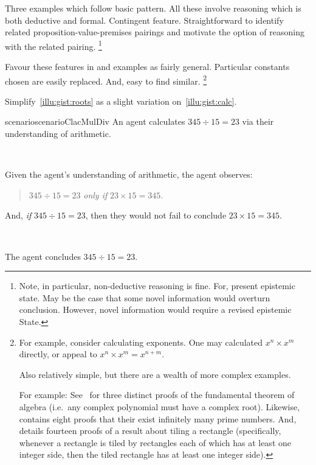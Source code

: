 \begin{note}
  Three examples which follow basic pattern.
  All these involve reasoning which is both deductive and formal.
  Contingent feature.
  Straightforward to identify related proposition-value-premises pairings and motivate the option of reasoning with the related pairing.%
  \footnote{
    Note, in particular, non-deductive reasoning is fine.
    For, present epistemic state.
    May be the case that some novel information would overturn conclusion.
    However, novel information would require a revised epistemic State.
  }

  Favour these features in  and examples as fairly general.
  Particular constants chosen are easily replaced.
  And, easy to find similar.%
  \footnote{
    For example, consider calculating exponents.
    One may calculated \(x^{n} \times x^{m}\) directly, or appeal to \(x^{n} \times x^{m} = x^{n + m}\).
 
    Also relatively simple, but there are a wealth of more complex examples.

    For example:
    See~\textcite{Fine:1997vc} for three distinct proofs of the fundamental theorem of algebra (i.e.\ any complex polynomial must have a complex root).
    Likewise, \textcite{Ribenboim:2012ts} contains eight proofs that their exist infinitely many prime numbers.
    And, \textcite{Wagon:1987vm} details fourteen proofs of a result about tiling a rectangle (specifically, whenever a rectangle is tiled by rectangles each of which has at least one integer side, then the tiled rectangle has at least one integer side).
  }
\end{note}

\begin{note}
  Simplify~\ref{illu:gist:roots} as a slight variation on~\ref{illu:gist:calc}.

  \begin{restatable}{scenario}{scenarioClacMulDiv}
    \label{illu:sketch:math}
    An agent calculates \(345 \div 15 = 23\) via their understanding of arithmetic.

    \mbox{ }

    Given the agent's understanding of arithmetic, the agent observes:
    \begin{quote}
      \(345 \div 15 = 23\) \emph{only if} \(23 \times 15 = 345\).
    \end{quote}
    And, \emph{if} \(345 \div 15 = 23\), then they would not fail to conclude \(23 \times 15 = 345\).

    \mbox{ }

    The agent concludes \(345 \div 15 = 23\).
  \end{restatable}
\end{note}

